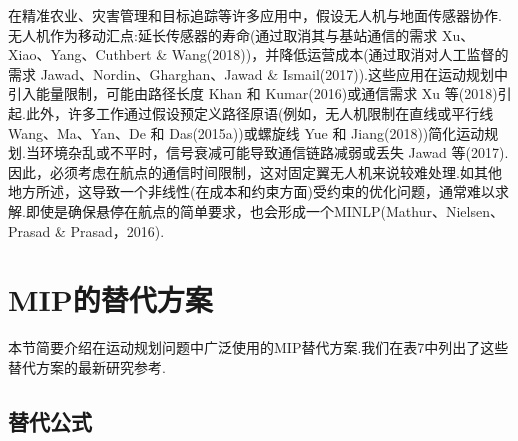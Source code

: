\documentclass[10pt]{article}
\begin{document}
在精准农业、灾害管理和目标追踪等许多应用中，假设无人机与地面传感器协作.无人机作为移动汇点:延长传感器的寿命(通过取消其与基站通信的需求 Xu、Xiao、Yang、Cuthbert \& Wang(2018))，并降低运营成本(通过取消对人工监督的需求 Jawad、Nordin、Gharghan、Jawad \& Ismail(2017)).这些应用在运动规划中引入能量限制，可能由路径长度 Khan 和 Kumar(2016)或通信需求 Xu 等(2018)引起.此外，许多工作通过假设预定义路径原语(例如，无人机限制在直线或平行线 Wang、Ma、Yan、De 和 Das(2015a))或螺旋线 Yue 和 Jiang(2018))简化运动规划.当环境杂乱或不平时，信号衰减可能导致通信链路减弱或丢失 Jawad 等(2017).因此，必须考虑在航点的通信时间限制，这对固定翼无人机来说较难处理.如其他地方所述，这导致一个非线性(在成本和约束方面)受约束的优化问题，通常难以求解.即使是确保悬停在航点的简单要求，也会形成一个MINLP(Mathur、Nielsen、Prasad \& Prasad，2016).

\section{MIP的替代方案}

本节简要介绍在运动规划问题中广泛使用的MIP替代方案.我们在表7中列出了这些替代方案的最新研究参考.


\begin{table}[h]
  \centering
  \caption{运动规划中MIP替代方案的分类.}
\end{table}


\subsection{替代公式}
\end{document}
